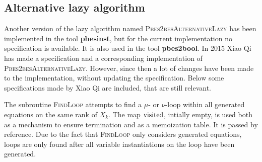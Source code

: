 \subsection{Alternative lazy algorithm}

Another version of the lazy algorithm named \textsc{Pbes2besAlternativeLazy}
has been implemented in the tool \textbf{pbesinst}, but for the current
implementation no specification is available. It is also used in the tool
\textbf{pbes2bool}. In 2015 Xiao Qi has made a specification and a
corresponding implementation of \textsc{Pbes2besAlternativeLazy}. However,
since then a lot of changes have been made to the implementation, without
updating the specification. Below some specifications made by Xiao Qi are
included, that are still relevant.

The subroutine \textsc{FindLoop} attempts to find a $\mu $- or $\nu $-loop
within all generated equations on the same rank of $X_{k}$. The map $\mathrm{%
visited}$, intially empty, is used both as a mechanism to ensure termination
and as a memoization table. It is passed by reference. Due to the fact that
\textsc{FindLoop} only considers generated equations, loops are only found
after all variable instantiations on the loop have been generated.

